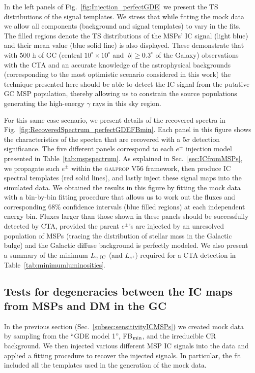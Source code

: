 \documentclass[doublespace,nopageskip]{VTthesis} %
\begin{document}
In the left panels of Fig.~\ref{fig:Injection_perfectGDE} we present the TS distributions of the signal templates. We stress that while fitting the mock data we allow all components (background and signal templates) to vary in the fits. The filled regions denote the TS distributions of the MSPs' IC signal (light blue) and their mean value (blue solid line) is also displayed. These demonstrate that with 500 h of GC (central $10^\circ\times10^\circ$ and $|b|\geq0.3^\circ$ of the Galaxy)  observations 
with the CTA
and an accurate knowledge of the astrophysical backgrounds (corresponding to the most optimistic scenario considered in this work) the technique presented here should be able to detect the IC signal from the putative GC MSP population, thereby allowing us to constrain the source populations generating the high-energy $\gamma$ rays in this sky region.




For this same case scenario, we present details of the recovered spectra in Fig.~\ref{fig:RecoveredSpectrum_perfectGDEFBmin}. Each panel in this figure shows the characteristics of the spectra that are recovered with a $5\sigma$ detection significance. The five different panels correspond to each $e^\pm$ injection model presented in Table~\ref{tab:mspspectrum}. As explained in Sec.~\ref{sec:ICfromMSPs}, we propagate such $e^\pm$ within the \textsc{galprop} V56 framework, then produce IC spectral templates (red solid lines), and lastly inject these signal maps into the simulated data. We obtained the results in this figure by fitting the mock data with a bin-by-bin fitting procedure that allows us to work out the fluxes and corresponding 68\% confidence intervals (blue filled regions) at each independent energy bin. Fluxes larger than those shown in these panels should be successfully detected by CTA, provided the parent $e^\pm$'s are injected by an unresolved population of MSPs (tracing the distribution of stellar mass in the Galactic bulge) and the Galactic diffuse background is perfectly modeled. We also present a summary of the minimum $L_{\gamma,{\rm IC}}$ (and $L_{e^\pm}$) 
required for a CTA detection in Table~\ref{tab:minimumluminosities}.

\subsection{Tests for degeneracies between the IC maps from MSPs and DM in the GC}
\label{subsec:degeneracyDMvsMSPs}

In the previous section (Sec.~\ref{subsec:sensitivityICMSPs}) we created mock data by sampling from the  ``GDE model 1'', FB$_{\rm min}$, and the irreducible CR background. We then injected various different MSP IC signals into the data and applied a fitting procedure to recover the injected signals. In particular, the fit included all the templates used in the generation of the mock data. 
\end{document}
